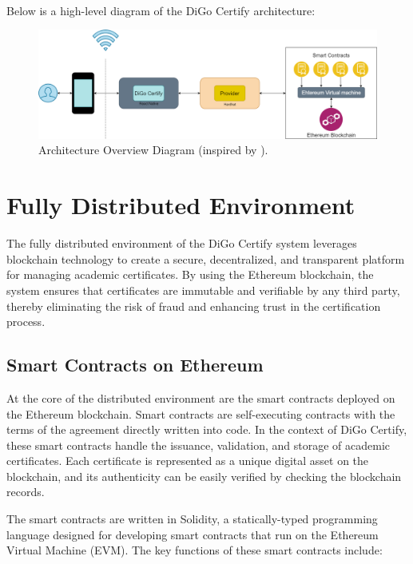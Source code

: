 \paragraph{}
Below is a high-level diagram of the DiGo Certify architecture:

\begin{figure}[H]
    \centering
    \includegraphics[width=1\textwidth]{assets/architecture-overview.drawio.png}
    \caption{Architecture Overview Diagram (inspired by \cite{geeksforgeeks-dApps}).}
    \label{fig:architecture-overview}
\end{figure}

\section{Fully Distributed Environment}\label{sec:fully-distributed-environment}

The fully distributed environment of the DiGo Certify system leverages blockchain technology to create a secure, decentralized, and transparent platform for managing academic certificates. By using the Ethereum blockchain, the system ensures that certificates are immutable and verifiable by any third party, thereby eliminating the risk of fraud and enhancing trust in the certification process.

\subsection{Smart Contracts on Ethereum}

At the core of the distributed environment are the smart contracts deployed on the Ethereum blockchain. Smart contracts are self-executing contracts with the terms of the agreement directly written into code. In the context of DiGo Certify, these smart contracts handle the issuance, validation, and storage of academic certificates. Each certificate is represented as a unique digital asset on the blockchain, and its authenticity can be easily verified by checking the blockchain records.

The smart contracts are written in Solidity, a statically-typed programming language designed for developing smart contracts that run on the Ethereum Virtual Machine (EVM). The key functions of these smart contracts include:

